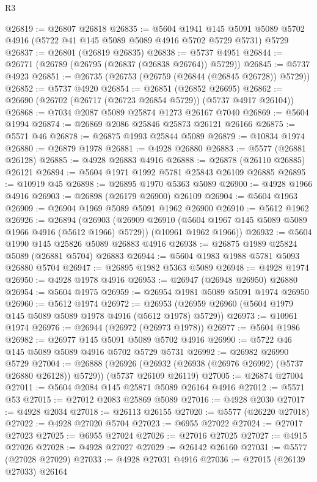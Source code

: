 \begin{lexlean}{R3}
\begin{coremodule}
@26819 := @26807 @26818
@26835 := @5604
    @1941
    @145
    @5091
    @5089
    @5702
    @4916
    (@5722 @41 @145 @5089 @5089 @4916 @5702 @5729 @5731)
    @5729
@26837 := @26801 (@26819 @26835)
@26838 := @5737 @4951
@26844 := @26771 (@26789 (@26795 (@26837 (@26838 @26764)) @5729))
@26845 := @5737 @4923
@26851 := @26735 (@26753 (@26759 (@26844 (@26845 @26728)) @5729))
@26852 := @5737 @4920
@26854 := @26851 (@26852 @26695)
@26862 := @26690 (@26702 (@26717 (@26723 @26854 @5729)) (@5737 @4917 @26104))
@26868 := @7034 @2087 @5089 @25874 @1273 @26167 @7040
@26869 := @5604 @1994
@26874 := @26869 @2086 @25846 @25873 @26121 @26166
@26875 := @5571 @46
@26878 := @26875 @1993 @25844 @5089
@26879 := @10834 @1974
@26880 := @26879 @1978
@26881 := @4928 @26880
@26883 := @5577 (@26881 @26128)
@26885 := @4928 @26883 @4916
@26888 := @26878 (@26110 @26885) @26121
@26894 := @5604 @1971 @1992 @5781 @25843 @26109 @26885
@26895 := @10919 @45
@26898 := @26895 @1970 @5363 @5089
@26900 := @4928 @1966 @4916
@26903 := @26898 (@26179 @26900) @26109
@26904 := @5604 @1963
@26909 := @26904 @1969 @5089 @5091 @1962 @26900
@26910 := @5612 @1962
@26926 := @26894
    (@26903
      (@26909 @26910 (@5604 @1967 @145 @5089 @5089 @1966 @4916 (@5612 @1966) @5729))
      (@10961 @1962 @1966))
@26932 := @5604 @1990 @145 @25826 @5089 @26883 @4916
@26938 := @26875 @1989 @25824 @5089 (@26881 @5704) @26883
@26944 := @5604 @1983 @1988 @5781 @5093 @26880 @5704
@26947 := @26895 @1982 @5363 @5089
@26948 := @4928 @1974
@26950 := @4928 @1978 @4916
@26953 := @26947 (@26948 @26950) @26880
@26954 := @5604 @1975
@26959 := @26954 @1981 @5089 @5091 @1974 @26950
@26960 := @5612 @1974
@26972 := @26953 (@26959 @26960 (@5604 @1979 @145 @5089 @5089 @1978 @4916 (@5612 @1978) @5729))
@26973 := @10961 @1974
@26976 := @26944 (@26972 (@26973 @1978))
@26977 := @5604 @1986
@26982 := @26977 @145 @5091 @5089 @5702 @4916
@26990 := @5722 @46 @145 @5089 @5089 @4916 @5702 @5729 @5731
@26992 := @26982 @26990 @5729
@27004 := @26888
    (@26926 (@26932 (@26938 (@26976 @26992) (@5737 @26880 @26128)) @5729))
    (@5737 @26109 @26119)
@27005 := @26874 @27004
@27011 := @5604 @2084 @145 @25871 @5089 @26164 @4916
@27012 := @5571 @53
@27015 := @27012 @2083 @25869 @5089
@27016 := @4928 @2030
@27017 := @4928 @2034
@27018 := @26113 @26155
@27020 := @5577 (@26220 @27018)
@27022 := @4928 @27020 @5704
@27023 := @6955 @27022
@27024 := @27017 @27023
@27025 := @6955 @27024
@27026 := @27016 @27025
@27027 := @4915 @27026
@27028 := @4928 @27027
@27029 := @26142 @26160
@27031 := @5577 (@27028 @27029)
@27033 := @4928 @27031 @4916
@27036 := @27015 (@26139 @27033) @26164

\end{coremodule}
\end{lexlean}
